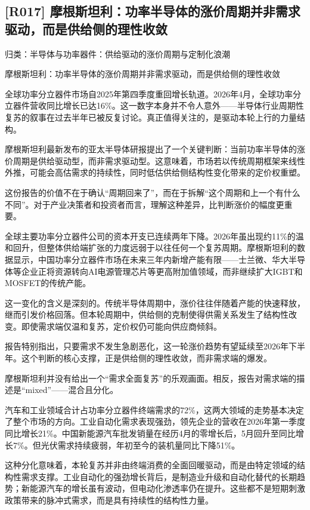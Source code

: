 \documentclass[11pt]{ctexart}
\begin{document}
\subsection{[R017] 摩根斯坦利：功率半导体的涨价周期并非需求驱动，而是供给侧的理性收敛}
{\small\color{refgray}归类：半导体与功率器件：供给驱动的涨价周期与定制化浪潮}

摩根斯坦利：功率半导体的涨价周期并非需求驱动，而是供给侧的理性收敛

全球功率分立器件市场自2025年第四季度重回增长轨道。2026年4月，全球功率分立器件营收同比增长已达16\%。这一数字本身并不令人意外——半导体行业周期性复苏的叙事在过去半年已被反复讨论。真正值得关注的，是驱动本轮上行的力量结构。

摩根斯坦利最新发布的亚太半导体研报提出了一个关键判断：当前功率半导体的涨价周期是供给驱动型，而非需求驱动型。这意味着，市场若以传统周期框架来线性外推，可能会高估需求的持续性，同时低估供给侧结构性变化带来的定价权重塑。

这份报告的价值不在于确认“周期回来了”，而在于拆解“这个周期和上一个有什么不同”。对于产业决策者和投资者而言，理解这种差异，比判断涨价的幅度更重要。

全球主要功率分立器件公司的资本开支已连续两年下降。2026年虽出现约11\%的温和回升，但整体供给端扩张的力度远弱于以往任何一个复苏周期。摩根斯坦利的数据显示，中国功率分立器件市场在未来三年内新增产能有限——士兰微、华大半导体等企业正将资源转向AI电源管理芯片等更高附加值领域，而非继续扩大IGBT和MOSFET的传统产能。

这一变化的含义是深刻的。传统半导体周期中，涨价往往伴随着产能的快速释放，继而引发价格回落。但本轮周期中，供给侧的克制使得供需关系发生了结构性改变。即使需求端仅温和复苏，定价权仍可能向供应商倾斜。

报告特别指出，只要需求不发生急剧恶化，这一轮涨价趋势有望延续至2026年下半年。这个判断的核心支撑，正是供给侧的理性收敛，而非需求端的爆发。

摩根斯坦利并没有给出一个“需求全面复苏”的乐观画面。相反，报告对需求端的描述是“mixed”——混合且分化。

汽车和工业领域合计占功率分立器件终端需求的72\%，这两大领域的走势基本决定了整个市场的方向。工业自动化需求表现强劲，领先企业的营收在2026年第一季度同比增长21\%。中国新能源汽车批发销量在经历4月的零增长后，5月回升至同比增长7\%。但光伏需求持续疲弱，年初至今的装机量同比下降51\%。

这种分化意味着，本轮复苏并非由终端消费的全面回暖驱动，而是由特定领域的结构性需求支撑。工业自动化的强劲增长背后，是制造业升级和自动化替代的长期趋势；新能源汽车的增长虽有波动，但电动化渗透率仍在提升。这些都不是短期刺激政策带来的脉冲式需求，而是具有持续性的结构性力量。
\end{document}
